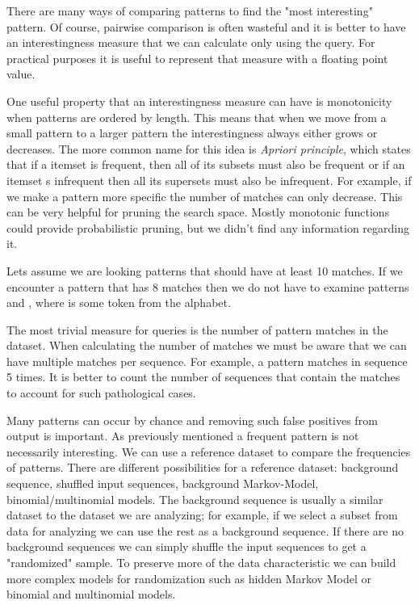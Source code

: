 There are many ways of comparing patterns to find the "most interesting" pattern. Of course, pairwise comparison is often wasteful and it is better to have an interestingness measure that we can calculate only using the query. For practical purposes it is useful to represent that measure with a floating point value.

One useful property that an interestingness measure can have is monotonicity when patterns are ordered by length. This means that when we move from a small pattern to a larger pattern the interestingness always either grows or decreases. The more common name for this idea is \emph{Apriori principle}, which states that if a itemset is frequent, then all of its subsets must also be frequent or if an itemset s infrequent then all its supersets must also be infrequent. For example, if we make a pattern more specific the number of matches can only decrease. This can be very helpful for pruning the search space. Mostly monotonic functions could provide probabilistic pruning, but we didn't find any information regarding it.

\begin{exmp}
Lets assume we are looking patterns that should have at least 10 matches. If we encounter a pattern  that has 8 matches then we do not have to examine patterns  and , where  is some token from the alphabet.
\end{exmp}

The most trivial measure for queries is the number of pattern matches in the dataset. When calculating the number of matches we must be aware that we can have multiple matches per sequence. For example, a pattern  matches in sequence  5 times. It is better to count the number of sequences that contain the matches to account for such pathological cases.

Many patterns can occur by chance and removing such false positives from output is important. As previously mentioned a frequent pattern is not necessarily interesting. We can use a reference dataset to compare the frequencies of patterns. There are different possibilities for a reference dataset: background sequence, shuffled input sequences, background Markov-Model, binomial/multinomial models. The background sequence is usually a similar dataset to the dataset we are analyzing; for example, if we select a subset from data for analyzing we can use the rest as a background sequence. If there are no background sequences we can simply shuffle the input sequences to get a "randomized" sample. To preserve more of the data characteristic we can build more complex models for randomization such as hidden Markov Model\cite{RatingMarkovModel} or binomial and multinomial models.

